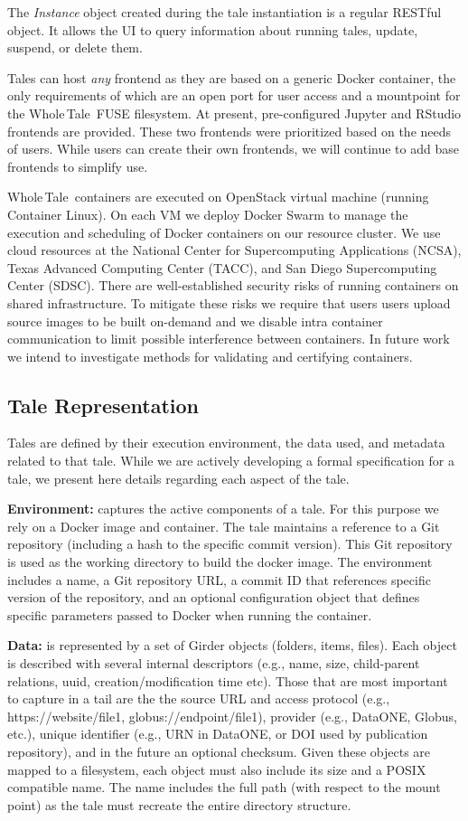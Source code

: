 \documentclass[review]{elsarticle}
\newcommand{\wt}{Whole\,Tale}
\begin{document}
The \emph{Instance} object created during the tale instantiation is a regular RESTful object. It allows the UI to query information about running tales, update, suspend, or delete them. 

Tales can host \emph{any} frontend as they are based on a generic
Docker container, the only requirements of which are an open port
for user access and a mountpoint for the \wt\ FUSE filesystem. 
At present, pre-configured Jupyter and RStudio frontends are provided. These two frontends were prioritized based on the needs of users.  
While users can create their own frontends, we will continue to add base
frontends to simplify use. 

\wt\ containers are executed on OpenStack virtual machine
(running Container Linux). On each VM we deploy Docker Swarm 
to manage the execution and scheduling of Docker containers
on our resource cluster. We use cloud resources at 
the National Center for Supercomputing Applications (NCSA), 
Texas Advanced Computing Center (TACC), and San Diego Supercomputing
Center (SDSC). 
There are well-established security risks of running containers
on shared infrastructure. To mitigate these risks we require that
users users upload source images to be built on-demand and
we disable intra container communication to limit possible interference
between containers. In future work we intend to investigate 
methods for validating and certifying containers.

\subsection{Tale Representation}
Tales are defined by their execution environment, the data used, and metadata related to that tale. While we are actively developing a formal specification for a tale, we present here details regarding each aspect of the tale.

\textbf{Environment:} captures the active components of a tale. For this purpose we rely on a Docker image and container. The tale 
maintains a reference to a Git repository (including a hash to the specific commit version). This Git repository is used as the working directory to build the docker image. 
The environment includes a name, a Git repository URL, a commit ID that references specific version of the repository, and an optional configuration object that defines specific parameters passed to Docker when running the container. 

\textbf{Data:} is represented by a set of Girder objects (folders, items, files). Each object is described with several internal descriptors (e.g., name, size, child-parent relations, uuid, creation/modification time etc). Those that are most important to capture in a tail are the the source URL and access protocol (e.g.,  https://website/file1, globus://endpoint/file1), provider (e.g., DataONE, Globus, etc.), unique identifier (e.g., URN in DataONE, or DOI used by publication repository), and in the future an optional checksum. Given these objects are mapped to a filesystem, each object must also include its size and a POSIX compatible name. The name includes the full path (with respect to the mount point) as the tale must recreate the entire directory structure. 
\end{document}
